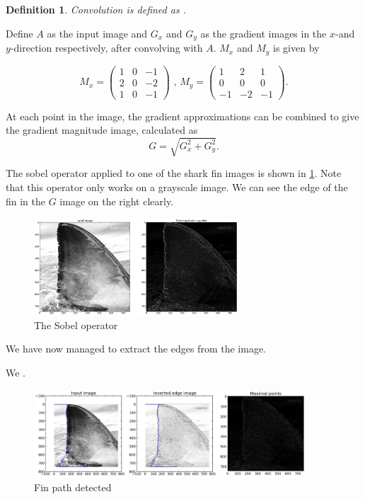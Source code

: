 \documentclass[a4paper,10pt]{article}
\newtheorem{mydef}{Definition}
\begin{document}
\begin{mydef}
Convolution is defined as .


\end{mydef}

Define $A$ as the input image and $G_x$ and $G_y$ as the gradient images in the $x$-and $y$-direction respectively,
after convolving with $A$.  $M_x$ and $M_y$ is given by

\[
 M_x = \begin{pmatrix*}
        1 & 0 & -1 \\
        2 & 0 & -2 \\
        1 & 0 & -1
       \end{pmatrix*}
\mbox{ , }
 M_y = \begin{pmatrix*}
        1 & 2 & 1 \\
        0 & 0 & 0 \\
        -1 & -2 & -1
       \end{pmatrix*}
.\]

At each point in the image, the gradient approximations can be combined to give the gradient magnitude image, calculated  as
\[
 G = \sqrt{G_x^2+G_y^2}
.\]

The sobel operator applied to one of the shark fin images is shown in \ref{sobel}.  Note that this operator only works on a grayscale image.
We can see the edge of the fin in the $G$ image on the right clearly.

\begin{figure}[H]
 \centering
 \includegraphics[width=3in]{sobel.jpg}
 \caption{The Sobel operator}
 \label{sobel}
\end{figure}

We have now managed to extract the edges from the image.

We .

\begin{figure}[H]
 \centering
 \includegraphics[width=4in]{finpath.jpg}
 \caption{Fin path detected}
 \label{fin}
\end{figure}
\end{document}
